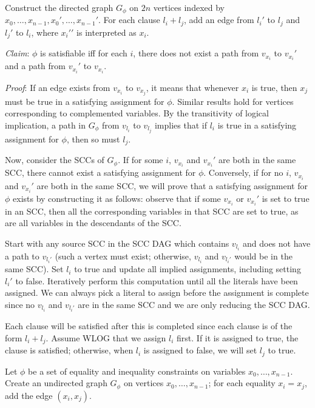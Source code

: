Construct the directed graph $G_\phi$ on $2n$ vertices indexed by $x_0,\ldots,x_{n-1},{x_0}',\ldots,{x_{n-1}}'$.
For each clause $l_i + l_j$, add an edge from ${l_i}'$ to ${l_j}$ and
${l_j}'$ to ${l_i}$, where ${{x_i}'}'$ is interpreted as $x_i$.

{\em Claim}: $\phi$ is satisfiable iff for each $i$, there does not exist a path from
$v_{x_i}$ to $v_{x_i}'$ and a path  from $v_{x_i}'$ to $v_{x_i}$.

{\em Proof}: If an edge exists from $v_{x_i}$ to $v_{x_j}$, it means that whenever $x_i$ is true,
then $x_j$ must be true in a satisfying assignment for $\phi$. Similar results
hold for vertices corresponding to complemented
variables. By the transitivity of
logical implication, a path in $G_\phi$ from $v_{l_i}$ to $v_{l_j}$ implies that
if $l_i$ is true in a satisfying assignment for $\phi$, then so must $l_j$.

Now, consider the SCCs of $G_\phi$.  If for some $i$, $v_{x_i}$ and $v_{x_i}'$ are both
in the same SCC, there cannot exist a satisfying assignment for $\phi$.
Conversely, if for no $i$, $v_{x_i}$ and $v_{x_i}'$ are both
in the same SCC, we will prove that a satisfying
assignment for $\phi$ exists by constructing it as follows:
observe that if some $v_{x_i}$ or $v_{x_i}'$ is set to true
in an SCC, then all the corresponding variables in that SCC are set to
true, as are all variables in the descendants of the SCC.

Start with any source SCC in the SCC DAG which contains
$v_{l_i}$ and does not have a path to $v_{{l_i}'}$ (such a vertex must exist; otherwise, $v_{l_i}$ and $v_{{l_i}'}$ would
be in the same SCC).
Set $l_i$ to true and update all implied assignments, including setting ${l_i}'$ to false. 
Iteratively perform this computation until all the literals have been assigned.  We can always
pick a literal to assign before the assignment is complete since no $v_{l_i}$ and $v_{{l_i}'}$
are in the same SCC and we are only reducing the SCC DAG.

Each clause will be satisfied after this is completed since each clause is of the form $l_i + l_j$.
Assume WLOG that we assign $l_i$ first.  If it is assigned to true, the clause is satisfied; otherwise, when $l_i$ is assigned to false, we will set ${l_j}$ to true.


Let $\phi$ be a set of equality and inequality constraints on variables
$x_0,\ldots,x_{n-1}$.  Create an undirected graph $G_\phi$ on vertices $x_0,\ldots,x_{n-1}$;
for each equality $x_i = x_j$, add the edge $(x_i,x_j)$.

